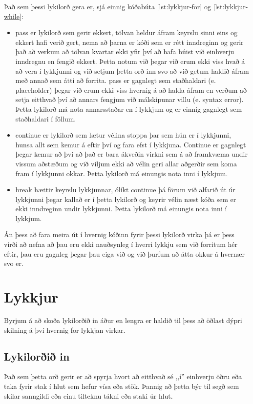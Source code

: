 Það sem þessi lykilorð gera er, sjá einnig kóðabúta \ref{lst:lykkjur-for} og \ref{lst:lykkjur-while}:
\begin{itemize}
	\item pass er lykilorð sem gerir ekkert, tölvan heldur áfram keyrslu sinni eins og ekkert hafi verið gert, nema að þarna er kóði sem er rétt inndreginn og gerir það að verkum að tölvan kvartar ekki yfir því að hafa búist við einhverju inndregnu en fengið ekkert.
	Þetta notum við þegar við erum ekki viss hvað á að vera í lykkjunni og við setjum þetta orð inn svo að við getum haldið áfram með annað sem átti að forrita.
	pass er gagnlegt sem staðhaldari (e. placeholder) þegar við erum ekki viss hvernig á að halda áfram en verðum að setja eitthvað því að annars fengjum við málskipunar villu (e. syntax error).
	Þetta lykilorð má nota annarsstaðar en í lykkjum og er einnig gagnlegt sem staðhaldari í föllum.
	\item continue er lykilorð sem lætur vélina stoppa þar sem hún er í lykkjunni, hunsa allt sem kemur á eftir því og fara efst í lykkjuna.
	Continue er gagnlegt þegar kemur að því að það er bara ákveðin virkni sem á að framkvæma undir vissum aðstæðum og við viljum ekki að vélin geri allar aðgerðir sem koma fram í lykkjunni okkar.
	Þetta lykilorð má einungis nota inni í lykkjum.
	\item break hættir keyrslu lykkjunnar, ólíkt continue þá förum við alfarið út úr lykkjunni þegar kallað er í þetta lykilorð og keyrir vélin næst kóða sem er ekki inndreginn undir lykkjunni.
	Þetta lykilorð má einungis nota inni í lykkjum.
\end{itemize}

Án þess að fara meira út í hvernig kóðinn fyrir þessi lykilorð virka þá er þess virði að nefna að þau eru ekki nauðsynleg í hverri lykkju sem við forritum hér eftir, þau eru gagnleg þegar þau eiga við og við þurfum að átta okkur á hvernær svo er.

\section{Lykkjur}
Byrjum á að skoða lykilorðið in áður en lengra er haldið til þess að öðlast dýpri skilning á því hvernig for lykkjan virkar.

\subsection{Lykilorðið in}
Það sem þetta orð gerir er að spyrja hvort að eitthvað sé ,,í'' einhverju öðru eða taka fyrir stak í hlut sem hefur vísa eða stök.
Þannig að þetta býr til segð sem skilar sanngildi eða einu tilteknu tákni eða staki úr hlut.

